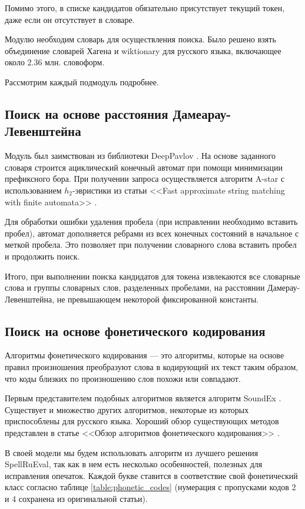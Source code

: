Помимо этого, в списке кандидатов обязательно присутствует текущий токен, даже если он отсутствует в словаре. 

Модулю необходим словарь для осуществления поиска. Было решено взять объединение словарей Хагена \cite{Hagen} и wiktionary \cite{Wiktionary} для русского языка, включающее около 2.36 млн. словоформ.

Рассмотрим каждый подмодуль подробнее.

\subsection{Поиск на основе расстояния Дамеарау-Левенштейна}

Модуль был заимствован из библиотеки DeepPavlov \cite{Burtsev2015}. На основе заданного словаря строится ациклический конечный автомат при помощи минимизации префиксного бора. При получении запроса осуществляется алгоритм  A-star \cite{Hart1968} с использованием $h_2$-эвристики из статьи <<Fast approximate string matching with finite automata>> \cite{Hulden2009}.

Для обработки ошибки удаления пробела (при исправлении необходимо вставить пробел), автомат дополняется ребрами из всех конечных состояний в начальное с меткой пробела. Это позволяет при получении словарного слова вставить пробел и продолжить поиск. 

Итого, при выполнении поиска кандидатов для токена извлекаются все словарные слова и группы словарных слов, разделенных пробелами, на расстоянии Дамерау-Левенштейна, не превышающем некоторой фиксированной константы.

\subsection{Поиск на основе фонетического кодирования}

Алгоритмы фонетического кодирования --- это алгоритмы, которые на основе правил произношения преобразуют слова в кодирующий их текст таким образом, что коды близких по произношению слов похожи или совпадают.

Первым представителем подобных алгоритмов является алгоритм SoundEx \cite{Russell1917} \cite{Russell1922}. Существует и множество других алгоритмов, некоторые из которых приспособлены для русского языка. Хороший обзор существующих методов представлен в статье <<Обзор алгоритмов фонетического кодирования>> \cite{Vichovanetch2018}.

В своей модели мы будем использовать алгоритм из лучшего решения SpellRuEval, так как в нем есть несколько особенностей, полезных для исправления опечаток. Каждой букве ставится в соответствие свой фонетический класс согласно таблице \ref{table:phonetic_codes} (нумерация с пропусками кодов 2 и 4 сохранена из оригинальной статьи). 

